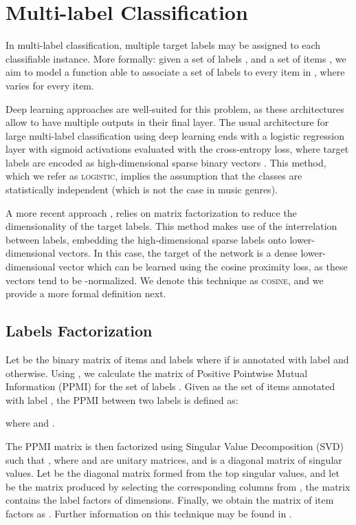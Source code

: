 \documentclass{article}
\begin{document}
\section{Multi-label Classification}\label{sec:multilabel}



In multi-label classification, multiple target labels may be assigned to each classifiable instance. More formally: given a set of  labels , and a set of  items , we aim to model a function  able to associate a set of  labels to every item in , where  varies for every item. 

Deep learning approaches are well-suited for this problem, as these architectures allow to have multiple outputs in their final layer.
The usual architecture for large multi-label classification using deep learning ends with a logistic regression layer with sigmoid activations evaluated with the cross-entropy loss, where target labels are encoded as high-dimensional sparse binary vectors \cite{szegedy2016rethinking}. 
This method, which we refer as \textsc{logistic}, implies the assumption that the classes are statistically independent (which is not the case in music genres).


A more recent approach \cite{Chollet2016}, relies on matrix factorization to reduce the dimensionality of the target labels. 
This method makes use of the interrelation between labels, embedding the high-dimensional sparse labels onto lower-dimensional vectors.
In this case, the target of the network is a dense lower-dimensional vector which can be learned using the cosine proximity loss, as these vectors tend to be -normalized. 
We denote this technique as \textsc{cosine}, and we provide a more formal definition next.

\subsection{Labels Factorization}\label{sec:factorization}






Let  be the binary matrix of items  and labels  where  if  is annotated with label  and  otherwise. Using , we calculate the matrix  of Positive Pointwise Mutual Information (PPMI) for the set of labels . Given  as the set of items annotated with label , the PPMI between two labels is defined as:



where  and .

The PPMI matrix  is then factorized using Singular Value Decomposition (SVD) such that , where  and  are unitary matrices, and  is a diagonal matrix of singular values. Let  be the diagonal matrix formed from the top  singular values, and let  be the matrix produced by selecting the corresponding columns from , the matrix  contains the label factors of  dimensions. Finally, we obtain the matrix of item factors  as . Further information on this technique may be found in \cite{levy2014neural}.
\end{document}
